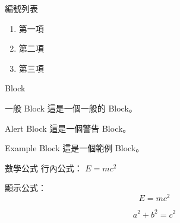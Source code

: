 \documentclass[aspectratio=169]{beamer}
\begin{document}
\begin{frame}{編號列表}
    \begin{enumerate}
    
        \item 第一項
        \item 第二項
        \item 第三項
        
    \end{enumerate}
\end{frame}


\begin{frame}{Block}
    \begin{block}{一般 Block}
        這是一個一般的 Block。
    \end{block}
    
    \begin{alertblock}{Alert Block}
        這是一個警告 Block。
    \end{alertblock}

    \begin{exampleblock}{Example Block}
        這是一個範例 Block。
    \end{exampleblock}
\end{frame}


\begin{frame}{數學公式}
    行內公式：
    $E = mc^2$
    \bigskip

    顯示公式：
    \[
        E = mc^2
    \]

    \begin{equation}
        a^2 + b^2 = c^2
    \end{equation}
\end{frame}
\end{document}
